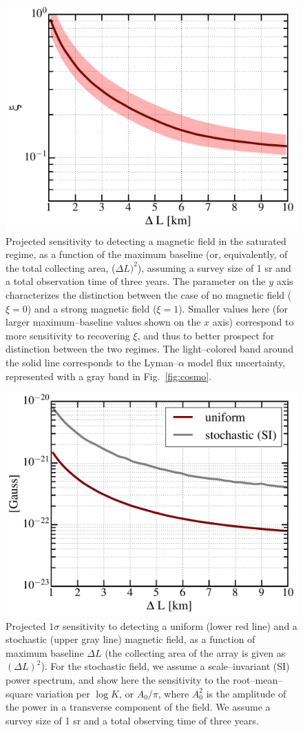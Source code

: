 \begin{figure}
\centering
\includegraphics[width=.35\textwidth,keepaspectratio=true]{xi_vs_deltas.pdf}
\caption{Projected sensitivity to detecting a magnetic field in the saturated regime, as a function of the maximum baseline (or, equivalently, of the total collecting area, ($\Delta L)^2$), assuming a survey size of 1 sr and a total observation time of three years. The parameter on the $y$ axis characterizes the distinction between the case of no magnetic field ($\xi=0$) and a strong magnetic field ($\xi=1$). Smaller values here (for larger maximum--baseline values shown on the $x$ axis) correspond to more sensitivity to recovering $\xi$, and thus to better prospect for distinction between the two regimes. The light--colored band around the solid line corresponds to the Lyman--$\alpha$ model flux uncertainty, represented with a gray band in Fig.~\ref{fig:cosmo}.\label{fig:xi_vs_deltas}}
\end{figure}
\begin{figure}
\centering
\includegraphics[width=.35\textwidth,keepaspectratio=true]{B_vs_deltas.pdf}
\caption{Projected $1\sigma$ sensitivity to detecting a uniform (lower red line) and a stochastic (upper gray line) magnetic field, as a function of maximum baseline $\Delta L$ (the collecting area of the array is given as $(\Delta L)^2$).  For the stochastic field, we assume a scale--invariant (SI) power spectrum, and show here the sensitivity to the root--mean--square variation per $\log K$, or $A_0/\pi$, where $A_0^2$ is the amplitude of the power in a transverse component of the field. We assume a survey size of 1 sr and a total observing time of three years.\label{fig:B_vs_deltas}}
\end{figure}
